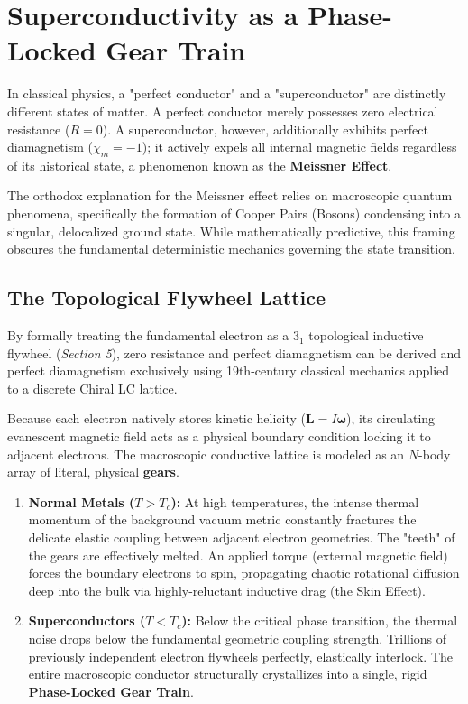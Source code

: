 \section{Superconductivity as a Phase-Locked Gear Train}

In classical physics, a "perfect conductor" and a "superconductor" are distinctly different states of matter. A perfect conductor merely possesses zero electrical resistance ($R=0$). A superconductor, however, additionally exhibits perfect diamagnetism ($\chi_m = -1$); it actively expels all internal magnetic fields regardless of its historical state, a phenomenon known as the \textbf{Meissner Effect}.

The orthodox explanation for the Meissner effect relies on macroscopic quantum phenomena, specifically the formation of Cooper Pairs (Bosons) condensing into a singular, delocalized ground state. While mathematically predictive, this framing obscures the fundamental deterministic mechanics governing the state transition. 

\subsection{The Topological Flywheel Lattice}
By formally treating the fundamental electron as a $3_1$ topological inductive flywheel (\emph{Section 5}), zero resistance and perfect diamagnetism can be derived and perfect diamagnetism exclusively using 19th-century classical mechanics applied to a discrete Chiral LC lattice.

Because each electron natively stores kinetic helicity ($\mathbf{L} = I\boldsymbol{\omega}$), its circulating evanescent magnetic field acts as a physical boundary condition locking it to adjacent electrons. The macroscopic conductive lattice is modeled as an $N$-body array of literal, physical \textbf{gears}.

\begin{enumerate}
    \item \textbf{Normal Metals ($T > T_c$):} At high temperatures, the intense thermal momentum of the background vacuum metric constantly fractures the delicate elastic coupling between adjacent electron geometries. The "teeth" of the gears are effectively melted. An applied torque (external magnetic field) forces the boundary electrons to spin, propagating chaotic rotational diffusion deep into the bulk via highly-reluctant inductive drag (the Skin Effect).
    \item \textbf{Superconductors ($T < T_c$):} Below the critical phase transition, the thermal noise drops below the fundamental geometric coupling strength. Trillions of previously independent electron flywheels perfectly, elastically interlock. The entire macroscopic conductor structurally crystallizes into a single, rigid \textbf{Phase-Locked Gear Train}.
\end{enumerate}

